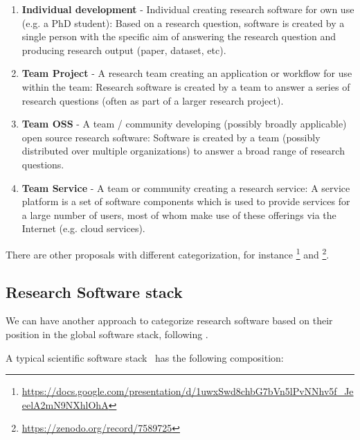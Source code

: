 \begin{enumerate}
    \item \textbf{Individual development} - Individual creating research software for own use (e.g. a PhD student): Based on a research question, software is created by a single person with the specific aim of answering the research question and producing research output (paper, dataset, etc).
    \item \textbf{Team Project} - A research team creating an application or workflow for use within the team: Research software is created by a team to answer a series of research questions (often as part of a larger research project).
    \item \textbf{Team OSS} - A team / community developing (possibly broadly applicable) open source research software: Software is created by a team (possibly distributed over multiple organizations) to answer a broad range of research questions.
    \item \textbf{Team Service} - A team or community creating a research service: A service platform is a set of software components which is used to provide services for a large number of users, most of whom make use of these offerings via the Internet (e.g. cloud services).
\end{enumerate}

There are other proposals with different categorization, for instance \footnote{\url{https://docs.google.com/presentation/d/1uwxSwd8chbG7bVn5lPvNNhv5f_JeeelA2mN9NXhlOhA}} and \footnote{\url{https://zenodo.org/record/7589725}}.

\subsection{Research Software stack}

We can have another approach to categorize research software based on
their position in the global software stack, following
\cite{hinsen2019}.


A typical scientific software stack~\cite{hinsen2019} has the following composition:

